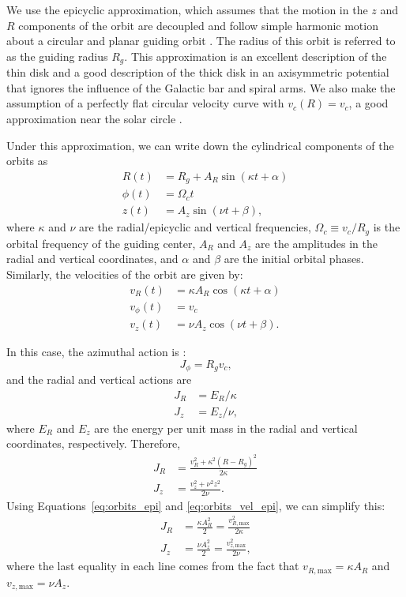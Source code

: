 \documentclass[twocolumn]{aastex62}
\newcommand{\beq}{\begin{equation}}
\newcommand{\eeq}{\end{equation}}
\begin{document}
We use the epicyclic approximation, which assumes that the motion in the $z$
and $R$ components of the orbit are decoupled and follow simple harmonic
motion about a circular and planar guiding orbit \citep[][Section~3.2 and
references therein]{2008gady.book.....B}. The radius of this orbit is referred
to as the guiding radius $R_g$. This approximation is an excellent description
of the thin disk and a good description of the thick disk in an axisymmetric
potential that ignores the influence of the Galactic bar and spiral arms. We
also make the assumption of a perfectly flat circular velocity curve with
$v_c(R) = v_c$, a good approximation near the solar circle
\citep[e.g.,][]{2017MNRAS.465...76M}.

Under this approximation, we can write down the cylindrical components
of the orbits as
\beq\label{eq:orbits_epi}
\begin{split}
R(t) &= R_g + A_R \sin{(\kappa t + \alpha)} \\
\phi(t) &= \Omega_c t \\
z(t) &= A_z \sin{(\nu t + \beta)}
\text{,}
\end{split}
\eeq
where $\kappa$ and $\nu$ are the radial/epicyclic and vertical frequencies, $\Omega_c
\equiv v_c/R_g$ is the orbital frequency of the guiding center, $A_R$ and
$A_z$ are the amplitudes in the radial and vertical coordinates, and $\alpha$
and $\beta$ are the initial orbital phases. Similarly, the velocities of the
orbit are given by:
\beq\label{eq:orbits_vel_epi}
\begin{split}
v_R(t) &= \kappa A_R \cos{(\kappa t + \alpha)} \\
v_{\phi}(t) &= v_c \\
v_z(t) &= \nu A_z \cos{(\nu t + \beta)}
\text{.}
\end{split}
\eeq

In this case, 
the azimuthal action is
\citep[][Section~3.5.3b]{2008gady.book.....B}:
\beq\label{eq:Jphi_epi}
J_{\phi} = R_g v_c\text{,}
\eeq
and the radial and vertical actions are
\beq\label{eq:JR_Jz_epi}
\begin{split}
J_R &= E_R / \kappa \\
J_z &= E_z / \nu\text{,} 
\end{split}
\eeq
where $E_R$ and $E_z$ are the energy per unit mass in the radial and vertical
coordinates, respectively. Therefore,
\beq\label{eq:JR_Jz_epi_energy}
\begin{split}
J_R &= \frac{v_R^2 + \kappa^2 (R-R_g)^2}{2\kappa} \\
J_z &= \frac{v_z^2 + \nu^2 z^2}{2\nu}\text{.}
\end{split}
\eeq
Using Equations~\eqref{eq:orbits_epi} and \eqref{eq:orbits_vel_epi}, we can
simplify this:
\beq\label{eq:JR_Jz_epi_final}
\begin{split}
J_R &= \frac{\kappa A_R^2}{2} = \frac{v_{R,\text{max}}^2}{2\kappa} \\
J_z &= \frac{\nu A_z^2}{2} = \frac{v_{z,\text{max}}^2}{2\nu}\text{,}
\end{split}
\eeq
where the last equality in each line comes from the fact that
$v_{R,\text{max}} = \kappa A_R$ and $v_{z,\text{max}} = \nu A_z$.
\end{document}
